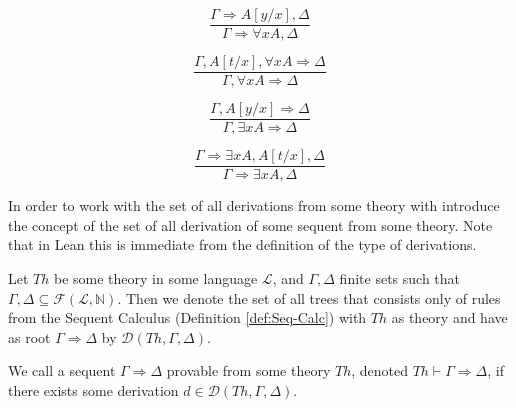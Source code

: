 \begin{definition}
\begin{multicols}{2}
\[
\frac{\Gamma \Rightarrow A[y/x], \Delta}{\Gamma \Rightarrow \forall x A, \Delta}\tag{$R\forall$}
\]

\[
\frac{\Gamma, A[t/x], \forall x A \Rightarrow \Delta}{\Gamma, \forall x A \Rightarrow \Delta}\tag{$L\forall$}
\]

\[
\frac{\Gamma, A[y/x] \Rightarrow \Delta}{\Gamma, \exists x A \Rightarrow \Delta}\tag{$L\exists$}
\]

\[
\frac{\Gamma \Rightarrow \exists x A, A[t/x], \Delta}{\Gamma \Rightarrow \exists x A, \Delta}\tag{$R\exists$}
\]

\end{multicols}

\end{definition}

In order to work with the set of all derivations from some theory with introduce the concept of the set of all derivation of some sequent from some theory. Note that in Lean this is immediate from the definition of the type of derivations.

\begin{definition}\label{def:Derivation}
\leanok
{}
Let $Th$ be some theory in some language $\mathcal{L}$, and $\Gamma, \Delta$ finite sets such that $\Gamma, \Delta \subseteq \mathcal{F}(\mathcal{L},\mathbb{N})$. Then we denote the set of all trees that consists only of rules from the Sequent Calculus (Definition \ref{def:Seq-Calc}) with $Th$ as theory and have as root $\Gamma \Rightarrow \Delta$ by $\mathcal{D}(Th,\Gamma,\Delta)$.
\end{definition}

\begin{definition}\label{def:Sequent-Provable}
\leanok
{}
We call a sequent $\Gamma \Rightarrow \Delta$ provable from some theory $Th$, denoted $Th \vdash \Gamma \Rightarrow \Delta$, if there exists some derivation $d \in \mathcal{D}(Th,\Gamma,\Delta)$.
\end{definition}

